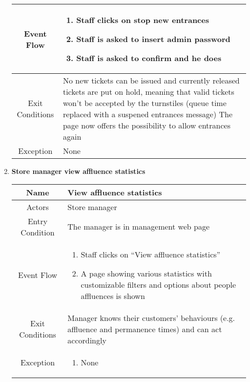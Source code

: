 \begin{enumerate}
\begin{table}[H]
{\begin{tabular}{|c|p{14cm}|}
			Event Flow & \begin{enumerate}
				\item Staff clicks on stop new entrances
				\item Staff is asked to insert admin password
				\item Staff is asked to confirm and he does
				
			\end{enumerate}\\
			
			\hline
			Exit Conditions & No new tickets can be issued and currently released tickets are put on hold, meaning that valid tickets won’t be accepted by the turnstiles (queue time replaced with a suspened entrances message)
			The page now offers the possibility to allow entrances again\\
			\hline
			
			Exception & None\\
			
			\hline
		\end{tabular}
	}
\end{table}

\item \textbf{Store manager view affluence statistics}

\begin{table}[H]
	{
		\begin{tabular}{|c|p{14cm}|}
			\hline
			Name & View affluence statistics\\
			\hline
			Actors & Store manager\\
			\hline
			Entry Condition & The manager is in management web page\\
			\hline
			
			Event Flow & \begin{enumerate}
				\item Staff clicks on “View affluence statistics”
				\item A page showing various statistics with customizable filters and options about people affluences is shown
				
			\end{enumerate}\\
			
			\hline
			Exit Conditions & Manager knows their customers’ behaviours (e.g. affluence and permanence times) and can act accordingly\\
			\hline
			
			Exception & \begin{enumerate}
				\item None
				

\end{enumerate}
\end{tabular}}
\end{table}
\end{enumerate}
